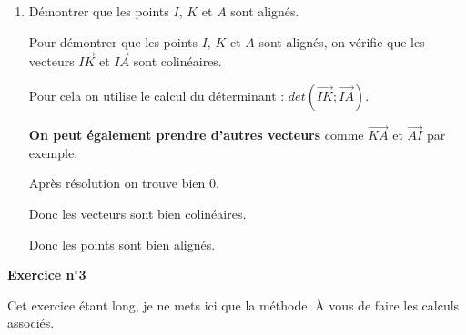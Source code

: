 \documentclass{article}
\newcommand*{\Coord}[2]{%
  \ensuremath{
    \begin{pmatrix}
      #1 \\[10pt]
      #2
    \end{pmatrix}}
}
\begin{document}
\begin{enumerate}
\begin{itemize}
        Par ailleurs, en calculant $\overrightarrow{BA}$ puis $\dfrac{1}{2}\overrightarrow{BC}$ on trouve que
        $\overrightarrow{BA} + \dfrac{1}{2}\overrightarrow{BC}\Coord{-\dfrac{13}{2}}{\dfrac{17}{2}}$

        On pose alors les équations : 

        $2x_K-8 = -\dfrac{13}{2}$

        $y_K+2 = \dfrac{17}{2}$.

        Après avoir résolu on trouve : 

        $K\Coord{\dfrac{3}{4}}{\dfrac{9}{4}}$.
    \end{itemize}

    \item Démontrer que les points $I$, $K$ et $A$ sont alignés.

    Pour démontrer que les points $I$, $K$ et $A$ sont alignés, on vérifie que les vecteurs $\overrightarrow{IK}$ et $\overrightarrow{IA}$ sont colinéaires.
    
    Pour cela on utilise le calcul du déterminant : $det(\overrightarrow{IK};\overrightarrow{IA})$.

    \textbf{On peut également prendre d'autres vecteurs} comme $\overrightarrow{KA}$ et $\overrightarrow{AI}$ par exemple.

    Après résolution on trouve bien $0$.

    Donc les vecteurs sont bien colinéaires.

    Donc les points sont bien alignés.

    

\end{enumerate}

\vspace{20pt}



\textbf{Exercice n$^\circ$3}

\vspace{5pt}
Cet exercice étant long, je ne mets ici que la méthode. À vous de faire les calculs associés.
\end{document}
